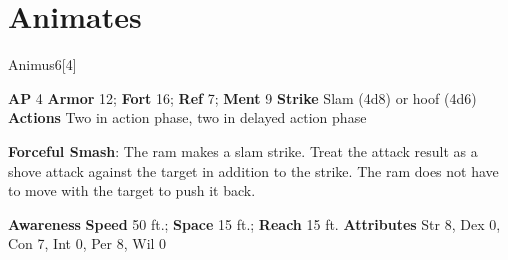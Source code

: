 \section{Animates}
\begin{monsection}[Ram]{Animus}{6}[4]
\vspace{-1em}\vspace{-1em}
\begin{spellcontent}
\begin{spelltargetinginfo}
{\textbf{AP} 4}
\pari \textbf{Armor} 12;
\textbf{Fort} 16;
\textbf{Ref} 7;
\textbf{Ment} 9
\pari \textbf{Strike} Slam  (4d8) or hoof  (4d6)
\pari \textbf{Actions} Two in action phase, two in delayed action phase
\end{spelltargetinginfo}
\begin{spelleffects}
\pari
\textbf{Forceful Smash}:
The ram makes a slam strike.
Treat the attack result as a shove attack against the target in addition to the strike.
The ram does not have to move with the target to push it back.
\end{spelleffects}
\end{spellcontent}
\begin{spellsubcontent}
\begin{spellfooter}
\pari \textbf{Awareness} 
\pari \textbf{Speed} 50 ft.;
\textbf{Space} 15 ft.;
\textbf{Reach} 15 ft.
\pari \textbf{Attributes}
Str 8,
Dex 0,
Con 7,
Int 0,
Per 8,
Wil 0
\end{spellfooter}
\end{spellsubcontent}
\end{monsection}
